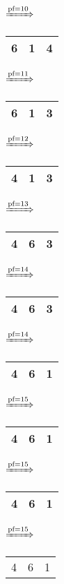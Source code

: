 \documentclass{article}
\begin{document}
\begin{itemize}
\begin{tabular}{|c|c|c|}
            \end{tabular}
            $\xRightarrow{\text{pf}=10}$
            \begin{tabular}{|c|c|c|}
                \hline
                6 & 1 & 4\\
                \hline
            \end{tabular}
            $\xRightarrow{\text{pf}=11}$
            \begin{tabular}{|c|c|c|}
                \hline
                6 & 1 & 3\\
                \hline
            \end{tabular}
            $\xRightarrow{\text{pf}=12}$
            \begin{tabular}{|c|c|c|}
                \hline
                4 & 1 & 3\\
                \hline
            \end{tabular}
            $\xRightarrow{\text{pf}=13}$
            \begin{tabular}{|c|c|c|}
                \hline
                4 & 6 & 3\\
                \hline
            \end{tabular}
            $\xRightarrow{\text{pf}=14}$
            \begin{tabular}{|c|c|c|}
                \hline
                4 & 6 & 3\\
                \hline
            \end{tabular}
            $\xRightarrow{\text{pf}=14}$
            \begin{tabular}{|c|c|c|}
                \hline
                4 & 6 & 1\\
                \hline
            \end{tabular}
            $\xRightarrow{\text{pf}=15}$
            \begin{tabular}{|c|c|c|}
                \hline
                4 & 6 & 1\\
                \hline
            \end{tabular}
            $\xRightarrow{\text{pf}=15}$
            \begin{tabular}{|c|c|c|}
                \hline
                4 & 6 & 1\\
                \hline
            \end{tabular}
            $\xRightarrow{\text{pf}=15}$
            \begin{tabular}{|c|c|c|}
                \hline
                4 & 6 & 1\\

\end{tabular}
\end{itemize}
\end{document}
